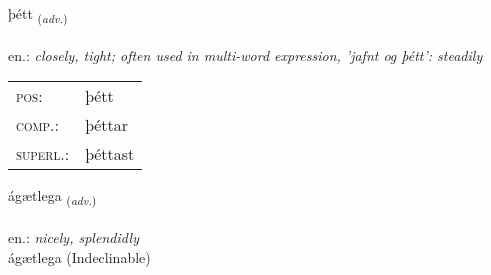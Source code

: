 \documentclass[frontgrid, backgrid]{flacards}\usepackage[]{graphicx}\usepackage[]{xcolor}
\begin{document}
\renewcommand{\flhead}{\vskip5pt \fboxsep=0pt {\small\bfseries\footnotesize Atviksorð | Adverb}}
\renewcommand{\fcfoot}{\vskip5pt \fboxsep=0pt \hspace{2pt}{\small\bfseries\footnotesize 2K}}

\renewcommand{\blhead}{\vskip5pt {\small\bfseries\footnotesize Atviksorð | Adverb }}
\renewcommand{\bcfoot}{\vskip5pt \hspace{2pt}{\small\bfseries\footnotesize 2K}}


{þétt \small{\textsubscript{(\textit{adv.})}} \\[1ex] %
\textphonetic{[θjɛht]} \\
en.: \emph{closely, tight; often used in multi-word expression, 'jafnt og þétt': steadily} \\  [2ex]
\renewcommand*{\arraystretch}{0.8}
\begin{tabular}{ll}
\textsc{pos}: & þétt \\ 
\textsc{comp.}: & þéttar \\ 
\textsc{superl.}: & þéttast \\
\end{tabular}
}


\renewcommand{\flhead}{\vskip5pt \fboxsep=0pt {\small\bfseries\footnotesize Atviksorð | Adverb}}
\renewcommand{\fcfoot}{\vskip5pt \fboxsep=0pt \hspace{2pt}{\small\bfseries\footnotesize 2K}}

\renewcommand{\blhead}{\vskip5pt {\small\bfseries\footnotesize Atviksorð | Adverb }}
\renewcommand{\bcfoot}{\vskip5pt \hspace{2pt}{\small\bfseries\footnotesize 2K}}


{ágætlega \small{\textsubscript{(\textit{adv.})}} \\[1ex]
\textphonetic{[auːcaitlɛɣa]} \\
en.: \emph{nicely, splendidly} \\  [2ex]
ágætlega (Indeclinable)}
\end{document}
